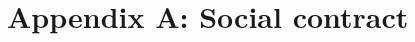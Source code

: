      \chapter{Appendix A: Social contract}
     \vspace{-15mm}
     \begin{figure}[!htb]
     \centering
       \label{fig:social_contract}
	\end{figure}